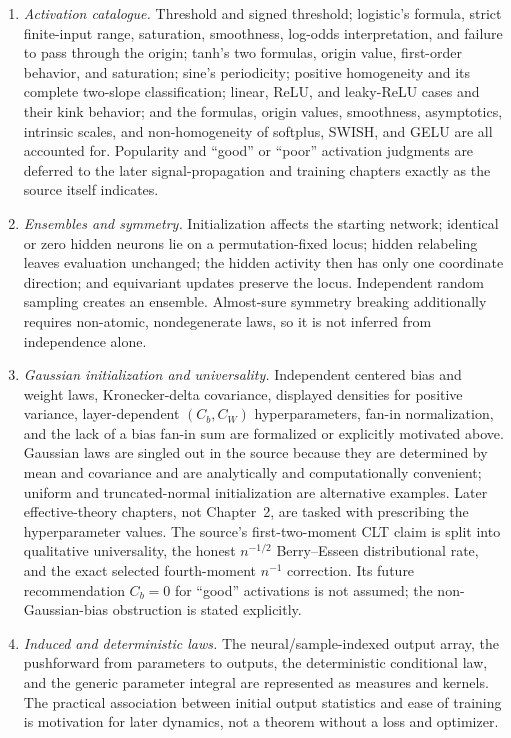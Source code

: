 \begin{enumerate}
  \item \emph{Activation catalogue.}  Threshold and signed threshold; logistic's formula, strict
    finite-input range, saturation, smoothness, log-odds interpretation, and failure to pass through
    the origin; tanh's two formulas, origin value, first-order behavior, and saturation; sine's
    periodicity; positive homogeneity and its complete two-slope classification; linear, ReLU, and
    leaky-ReLU cases and their kink behavior; and the formulas, origin values, smoothness,
    asymptotics, intrinsic scales, and non-homogeneity of softplus, SWISH, and GELU are all accounted
    for.  Popularity and ``good'' or ``poor'' activation judgments are deferred to the later
    signal-propagation and training chapters exactly as the source itself indicates.

  \item \emph{Ensembles and symmetry.}  Initialization affects the starting network; identical or
    zero hidden neurons lie on a permutation-fixed locus; hidden relabeling leaves evaluation
    unchanged; the hidden activity then has only one coordinate direction; and equivariant updates
    preserve the locus.  Independent random sampling creates an ensemble.  Almost-sure symmetry
    breaking additionally requires non-atomic, nondegenerate laws, so it is not inferred from
    independence alone.

  \item \emph{Gaussian initialization and universality.}  Independent centered bias and weight
    laws, Kronecker-delta covariance, displayed densities for positive variance, layer-dependent
    $(C_b,C_W)$ hyperparameters, fan-in normalization, and the lack of a bias fan-in sum are
    formalized or explicitly motivated above.  Gaussian laws are singled out in the source because
    they are determined by mean and covariance and are analytically and computationally convenient;
    uniform and truncated-normal initialization are alternative examples.  Later effective-theory
    chapters, not Chapter~2, are tasked with prescribing the hyperparameter values.  The source's
    first-two-moment CLT claim is split into qualitative
    universality, the honest $n^{-1/2}$ Berry--Esseen distributional rate, and the exact selected
    fourth-moment $n^{-1}$ correction.  Its future recommendation $C_b=0$ for ``good'' activations
    is not assumed; the non-Gaussian-bias obstruction is stated explicitly.

  \item \emph{Induced and deterministic laws.}  The neural/sample-indexed output array, the
    pushforward from parameters to outputs, the deterministic conditional law, and the generic
    parameter integral are represented as measures and kernels.  The practical association between
    initial output statistics and ease of training is motivation for later dynamics, not a theorem
    without a loss and optimizer.


\end{enumerate}
